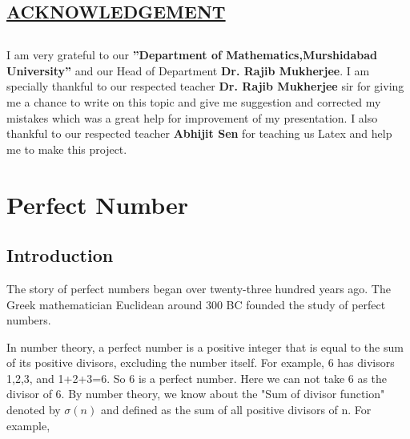 \documentclass[12pt,,a4paper]{book}
\begin{document}
\newpage



\begin{center}
    
\section*{\color{blue}\underline {ACKNOWLEDGEMENT}}
\end{center}
\thispagestyle{empty}
\section*{}
I am very grateful to our \textbf{”Department of Mathematics,Murshidabad
University”} and our Head of Department \textbf{Dr. Rajib Mukherjee}.
I am specially thankful to our respected teacher \textbf{Dr. Rajib Mukherjee} sir for
giving me a chance to write on this topic and give me suggestion and
corrected my mistakes which was a great help for improvement of my
presentation.
I also thankful to our respected teacher \textbf{Abhijit Sen} for teaching us Latex
and help me to make this project.
\newpage

\tableofcontents
\clearpage


 \fontsize{14pt}{10pt}\selectfont

 
\chapter*{Perfect Number}
\section{Introduction}
The story of perfect numbers began over twenty-three hundred years ago. The Greek mathematician Euclidean around 300 BC founded the study of perfect numbers.\par
	In number theory, a perfect number is a  positive integer that is equal to the sum of its positive divisors, excluding the number itself. For example, 6 has divisors 1,2,3, and 1+2+3=6. So 6 is a perfect number. Here we can not take 6 as the divisor of 6. By number theory, we know about the "Sum of divisor function" denoted by   $\sigma(n)$   and defined as the sum of all positive divisors of n. For example, 
\end{document}
